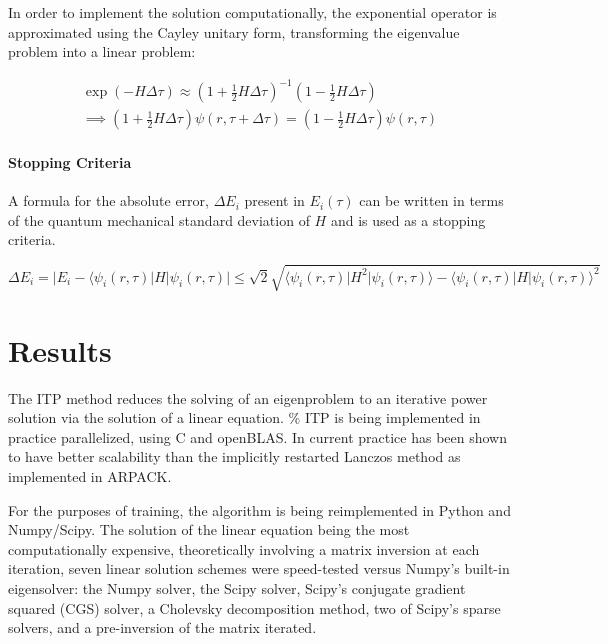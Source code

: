 \documentclass[12pt,]{book}
\let\oldparagraph\paragraph
\renewcommand{\paragraph}[1]{\oldparagraph{#1}\mbox{}}
\begin{document}
In order to implement the solution computationally, the exponential
operator is approximated using the Cayley unitary form, transforming the
eigenvalue problem into a linear problem:

\begin{align*}
\label{eq:CayleyExpansion}
\exp(-H\Delta\tau)\approx\left(1+\frac{1}{2}H\Delta\tau\right)^{-1}\left(1-\frac{1}{2}H\Delta\tau\right) \\ 
\implies \left(1+\frac{1}{2}H\Delta\tau\right)\psi(r,\tau+\Delta\tau)=\left(1-\frac{1}{2}H\Delta\tau\right)\psi(r,\tau)
\end{align*}

\paragraph{Stopping Criteria}

A formula for the absolute error, \(\Delta E_i\) present in
\(E_i(\tau)\) can be written in terms of the quantum mechanical standard
deviation of \(H\) and is used as a stopping criteria.

\begin{equation}
\label{eq:error}
\Delta E_i = \rvert E_i -\langle\psi_i(r,\tau)\rvert H\rvert\psi_i(r,\tau)\rvert\leq\sqrt{2}\sqrt{\langle\psi_i(r,\tau)\rvert H^2\rvert\psi_i(r,\tau)\rangle-\langle\psi_i(r,\tau)\rvert H\rvert\psi_i(r,\tau)\rangle^2}
\end{equation}

\section*{Results}

The ITP method reduces the solving of an eigenproblem to an iterative
power solution via the solution of a linear equation. \% ITP is being
implemented in practice parallelized, using C and openBLAS. In current
practice has been shown to have better scalability than the implicitly
restarted Lanczos method as implemented in ARPACK.

For the purposes of training, the algorithm is being reimplemented in
Python and Numpy/Scipy. The solution of the linear equation being the
most computationally expensive, theoretically involving a matrix
inversion at each iteration, seven linear solution schemes were
speed-tested versus Numpy's built-in eigensolver: the Numpy solver, the
Scipy solver, Scipy's conjugate gradient squared (CGS) solver, a
Cholevsky decomposition method, two of Scipy's sparse solvers, and a
pre-inversion of the matrix iterated.
\end{document}
